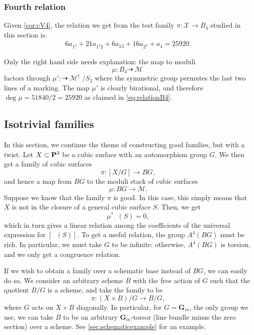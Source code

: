 \documentclass[12pt,reqno]{amsart}
\DeclareMathOperator{\Orb}{\overline{Orb}}
\DeclareMathOperator{\M}{\mathcal{M}}
\renewcommand{\to}{{\longrightarrow}}
\numberwithin{equation}{section}
\newcommand{\G}{\mathbf G}
\begin{document}
\subsubsection{Fourth relation}
\label{sec:relation-b_4}

Given \autoref{cor:cV4}, the relation we get from the test family
$\pi: \mathcal{X} \to B_{4}$ studied in this section is:
\begin{align}
  \label{eq:relationB4}
  6a_{1^{4}} + 21a_{1^{2}2}+6a_{13}+16a_{2^{2}}+a_{4} =  25920.
\end{align}

Only the right hand side needs explanation: the map to moduli
\[\mu: B_{4} \dashrightarrow \M \] factors through
$\mu' : \dashrightarrow \M^{\dagger}/S_{2}$ where the symmetric group
permutes the last two lines of a marking.  The map $\mu'$ is clearly
birational, and therefore $\deg \mu = 51840/2 = 25920$ as claimed in
\eqref{eq:relationB4}.



\subsection{Isotrivial families}
In this section, we continue the theme of constructing good families, but with a twist.
Let $X \subset \P^3$ be a cubic surface with an automorphism group $G$.
We then get a family of cubic surfaces
\[ \pi \colon [X/G] \to BG,\]
and hence a map from $BG$ to the moduli stack of cubic surfaces
\[ \mu \colon BG \to \mathscr M.\]
Suppose we know that the family $\pi$ is good.
In this case, this simply means that $X$ is not in the closure of a general cubic surface $S$.
Then, we get
\[ \mu^* \Orb(S) = 0,\]
which in turn gives a linear relation among the coefficients of the universal expression for $[\Orb(S)]$.
To get a useful relation, the group $A^4(BG)$ must be rich.
In particular, we must take $G$ to be infinite; otherwise, $A^4(BG)$ is torsion, and we only get a congruence relation.

If we wish to obtain a family over a schematic base instead of $BG$, we can easily do so.
We consider an arbitrary scheme $B$ with the free action of $G$ such that the quotient $B/G$ is a scheme, and take the family to be
\[ \pi \colon (X \times B)/G \to B/G,\]
where $G$ acts on $X \times B$ diagonally.
In particular, for $G = \G_m$, the only group we use, we can take $B$ to be an arbitrary $\G_m$-torsor (line bundle minus the zero section) over a scheme.
See \autoref{sec:schematicexample} for an example.
\end{document}
